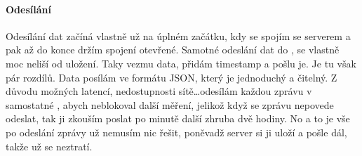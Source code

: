 \paragraph*{Odesílání}
Odesílání dat začíná vlastně už na úplném začátku, kdy se spojím se serverem a pak až do konce držím spojení otevřené. 
Samotné odeslání dat do , se vlastně moc neliší od uložení. Taky vezmu data, 
přidám \gls{timestamp} a pošlu je. Je tu však pár rozdílů. Data posílám ve formátu \gls{JSON}, který je jednoduchý 
a čitelný. Z důvodu možných latencí, nedostupnosti sítě\ldots odesílám každou zprávu v samostatné 
, abych neblokoval další měření, jelikož když se zprávu nepovede odeslat, tak ji zkouším 
poslat po minutě další zhruba dvě hodiny. No a to je vše po odeslání zprávy už nemusím nic řešit, poněvadž server si ji 
uloží a pošle dál, takže už se neztratí.
